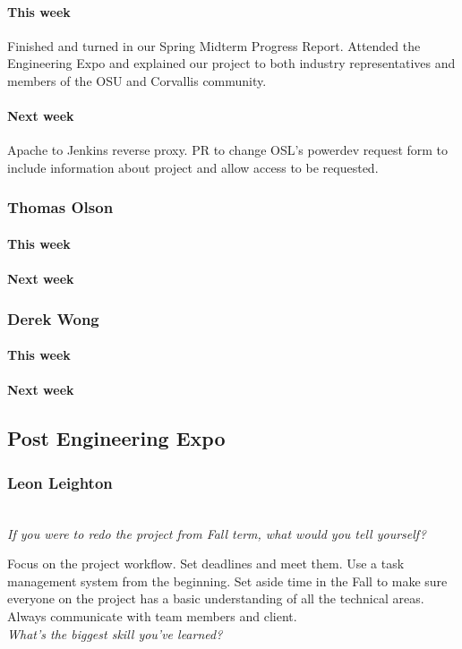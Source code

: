 \documentclass[10pt,letterpaper,onecolumn,draftclsnofoot]{IEEEtran}
\begin{document}
\paragraph{This week}Finished and turned in our Spring Midterm Progress Report.  
Attended the Engineering Expo and explained our project to both industry representatives and members of the OSU and Corvallis community.  
\paragraph{Next week}Apache to Jenkins reverse proxy.  
PR to change OSL's powerdev request form to include information about project and allow access to be requested.


\subsubsection{Thomas Olson}
\paragraph{This week}
\paragraph{Next week}


\subsubsection{Derek Wong}
\paragraph{This week}
\paragraph{Next week}

\subsection{Post Engineering Expo}
\subsubsection{Leon Leighton}
\textit{\\If you were to redo the project from Fall term, what would you tell yourself?}

Focus on the project workflow. Set deadlines and meet them. Use a task management system from the beginning. Set aside time in the Fall to make sure everyone on the project has a basic understanding of all the technical areas. Always communicate with team members and client.
\textit{\\What's the biggest skill you've learned?}
\end{document}

